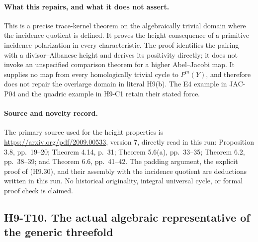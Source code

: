 \documentclass[11pt,a4paper]{article}
\begin{document}
\paragraph{What this repairs, and what it does not assert.}
This is a precise trace-kernel theorem on the algebraically trivial
domain where the incidence quotient is defined. It proves the height
consequence of a primitive incidence polarization in every characteristic.
The proof identifies the pairing with a divisor--Albanese height and
derives its positivity directly; it does not invoke an unspecified
comparison theorem for a higher Abel--Jacobi map. It supplies no map
from every homologically trivial cycle to $P^m(Y)$, and therefore does
not repair the overlarge domain in literal H9(b). The E4 example in
JAC-P04 and the quadric example in H9-C1 retain their stated force.

\paragraph{Source and novelty record.}
The primary source used for the height properties is
\url{https://arxiv.org/pdf/2009.00533}, version 7, directly read in this
run: Proposition 3.8, pp.~19--20; Theorem 4.14, p.~31; Theorem 5.6(a),
pp.~33--35; Theorem 6.2, pp.~38--39; and Theorem 6.6, pp.~41--42.
The padding argument, the explicit proof of (H9.30), and their assembly
with the incidence quotient are deductions written in this run. No
historical originality, integral universal cycle, or formal proof check
is claimed.



\subsection*{H9-T10. The actual algebraic representative of the generic threefold}
\end{document}

